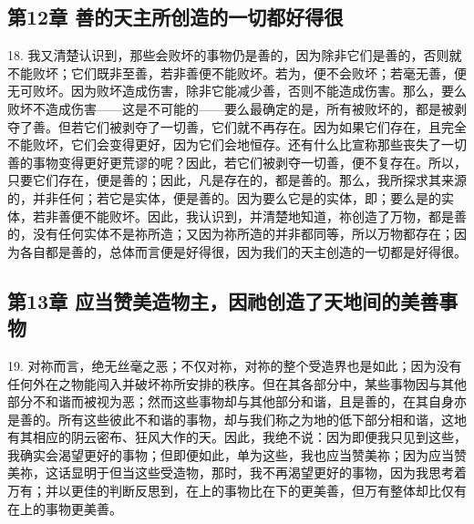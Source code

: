 
\subsection{第12章 善的天主所创造的一切都好得很}

18. 我又清楚认识到，那些会败坏的事物仍是善的，因为除非它们是善的，否则就不能败坏；它们既非至善，若非善便不能败坏。若为，便不会败坏；若毫无善，便无可败坏。因为败坏造成伤害，除非它能减少善，否则不能造成伤害。那么，要么败坏不造成伤害——这是不可能的——要么最确定的是，所有被败坏的，都是被剥夺了善。但若它们被剥夺了一切善，它们就不再存在。因为如果它们存在，且完全不能败坏，它们会变得更好，因为它们会地恒存。还有什么比宣称那些丧失了一切善的事物变得更好更荒谬的呢？因此，若它们被剥夺一切善，便不复存在。所以，只要它们存在，便是善的；因此，凡是存在的，都是善的。那么，我所探求其来源的，并非任何；若它是实体，便是善的。因为要么它是的实体，即；要么是的实体，若非善便不能败坏。因此，我认识到，并清楚地知道，祢创造了万物，都是善的，没有任何实体不是祢所造；又因为祢所造的并非都同等，所以万物都存在；因为各自都是善的，总体而言便是好得很，因为我们的天主创造的一切都是好得很。\par


\subsection{第13章 应当赞美造物主，因祂创造了天地间的美善事物}

19. 对祢而言，绝无丝毫之恶；不仅对祢，对祢的整个受造界也是如此；因为没有任何外在之物能闯入并破坏祢所安排的秩序。但在其各部分中，某些事物因与其他部分不和谐而被视为恶；然而这些事物却与其他部分和谐，且是善的，在其自身亦是善的。所有这些彼此不和谐的事物，却与我们称之为地的低下部分相和谐，这地有其相应的阴云密布、狂风大作的天。因此，我绝不说：因为即便我只见到这些，我确实会渴望更好的事物；但即便如此，单为这些，我也应当赞美祢；因为应当赞美祢，这话显明于但当这些受造物，那时，我不再渴望更好的事物，因为我思考着万有；并以更佳的判断反思到，在上的事物比在下的更美善，但万有整体却比仅有在上的事物更美善。\par

